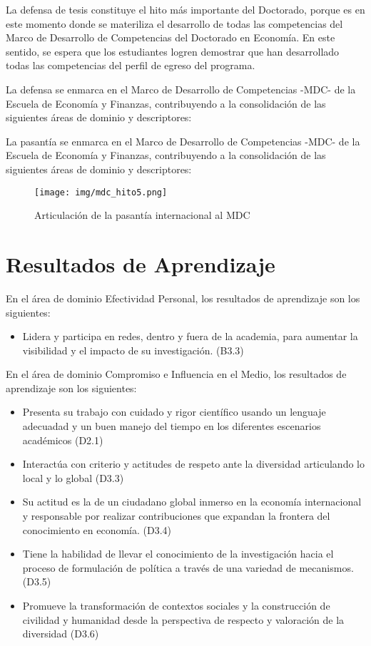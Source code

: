 La defensa de tesis constituye el hito más importante del Doctorado, porque es en este momento donde se materiliza el desarrollo de todas las competencias del Marco de Desarrollo de Competencias del Doctorado en Economía. En este sentido, se espera que los estudiantes logren demostrar que han desarrollado todas las competencias del perfil de egreso del programa.

La defensa se enmarca en el Marco de Desarrollo de Competencias -MDC- de la Escuela de Economía y Finanzas, contribuyendo a la consolidación de las siguientes áreas de dominio y descriptores:

La pasantía se enmarca en el Marco de Desarrollo de Competencias -MDC- de la Escuela de Economía y Finanzas, contribuyendo a la consolidación de las siguientes áreas de dominio y descriptores:

\begin{figure}[H]
\caption{Articulación de la pasantía internacional al MDC\label{hito1_mdc} }
\begin{center}
\texttt{[image: img/mdc\_hito5.png]}
\end{center}
\end{figure}

\section{Resultados de Aprendizaje}

En el área de dominio Efectividad Personal, los resultados de aprendizaje son los siguientes:
\begin{itemize}
\item 	Lidera y participa en redes, dentro y fuera de la academia, para aumentar la visibilidad y el impacto de su investigación. (B3.3)
\end{itemize}
En el área de dominio Compromiso e Influencia en el Medio, los resultados de aprendizaje son los siguientes:
\begin{itemize}
\item 	Presenta su trabajo con cuidado y rigor científico usando un lenguaje adecuadad y un buen manejo del tiempo en los diferentes escenarios académicos (D2.1)
\item 	Interactúa con criterio y actitudes de respeto ante la diversidad articulando lo local y lo global (D3.3)
\item 	Su actitud es la de un ciudadano global inmerso en la economía internacional y responsable por realizar contribuciones que expandan la frontera del conocimiento en economía. (D3.4)
\item 	Tiene la habilidad de llevar el conocimiento de la investigación hacia el proceso de formulación de política a través de una variedad de mecanismos. (D3.5)
\item 	Promueve la transformación de contextos sociales y la construcción de civilidad y humanidad desde la perspectiva de respecto y valoración de la diversidad (D3.6)
\end{itemize}
